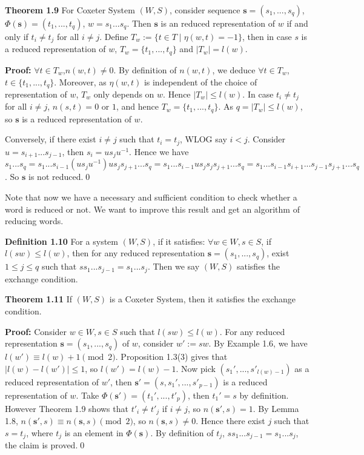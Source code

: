\vspace{\baselineskip}
\noindent \textbf{Theorem 1.9} For Coxeter System $(W,S)$, consider sequence $\mathbf{s}=(s_1,...,s_q)$, $\Phi(\mathbf{s})=(t_1,...,t_q)$, $w=s_1...s_q$. Then $\mathbf{s}$ is an reduced representation of $w$ if and only if $t_i \ne t_j$ for all $i \ne j$. Define $T_w:=\{t \in T \mid \eta(w,t)=-1\}$, then in case $s$ is a reduced representation of $w$, $T_w=\{t_1,...,t_q\}$ and $|T_w|=l(w)$.

\vspace{0.5\baselineskip} 
\noindent \textbf{Proof:} $\forall t \in T_w$,$n(w,t)\ne0$. By definition of $n(w,t)$, we deduce $\forall t \in T_w$,$t\in\{t_1,...,t_q\}$. Moreover, as $\eta(w,t)$ is independent of the choice of representation of $w$, $T_w$ only depends on $w$. Hence $|T_w|\le l(w)$. In case $t_i \ne t_j$ for all $i\ne j$, $n(s,t)=0$ or $1$, and hence $T_w=\{t_1,...,t_q\}$. As $q=|T_w| \le l(w)$, so $\mathbf{s}$ is a reduced representation of $w$. 

Conversely, if there exist $i \ne j$ such that $t_i=t_j$, WLOG say $i < j$. Consider $u=s_{i+1}...s_{j-1}$, then $s_i=us_ju^{-1}$. Hence we have $s_1...s_q=s_1...s_{i-1}(us_ju^{-1})us_js_{j+1}...s_q=s_1...s_{i-1}us_js_js_{j+1}...s_q=s_1...s_{i-1}s_{i+1}...s_{j-1}s_{j+1}...s_q$. So $\mathbf{s}$ is not reduced.\qed

\vspace{\baselineskip}
Note that now we have a necessary and sufficient condition to check whether a word is reduced or not. We want to improve this result and get an algorithm of reducing words. 

\vspace{\baselineskip}
\noindent \textbf{Definition 1.10} For a system $(W,S)$, if it satisfies: $\forall w \in W,s\in S$, if $l(sw) \le l(w)$, then for any reduced representation $\mathbf{s}=(s_1,...,s_q)$, exist $1\le j \le q$ such that $ss_1...s_{j-1}=s_1...s_j$. Then we say $(W,S)$ satisfies the exchange condition.

\vspace{\baselineskip}
\noindent \textbf{Theorem 1.11} If $(W,S)$ is a Coxeter System, then it satisfies the exchange condition. 

\vspace{0.5\baselineskip}
\noindent \textbf{Proof:} Consider $w\in W,s \in S$ such that $l(sw) \le l(w)$. For any reduced representation $\mathbf{s}=(s_1,...,s_q)$ of $w$, consider $w':=sw$. By Example 1.6, we have $l(w') \equiv l(w)+1\pmod{2}$. Proposition 1.3(3) gives that $|l(w)-l(w')|\le1$, so $l(w')=l(w)-1$. Now pick $(s_1',...,s'_{l(w)-1})$ as a reduced representation of $w'$, then $\mathbf{s'}=(s,s_1',...,s'_{p-1})$ is a reduced representation of $w$. Take $\Phi(\mathbf{s'})=(t_1',...,t'_p)$, then $t_1'=s$ by definition. However Theorem 1.9 shows that $t'_i \ne t'_j$ if $i\ne j$, so $n(\mathbf{s'},s)=1$. By Lemma 1.8, $n(\mathbf{s'},s) \equiv n(\mathbf{s},s)\pmod{2}$, so $n(\mathbf{s},s) \ne 0$. Hence there exist $j$ such that $s=t_j$, where $t_j$ is an element in $\Phi(\mathbf{s})$. By definition of $t_j$, $ss_1...s_{j-1}=s_1...s_j$, the claim is proved.\qed

